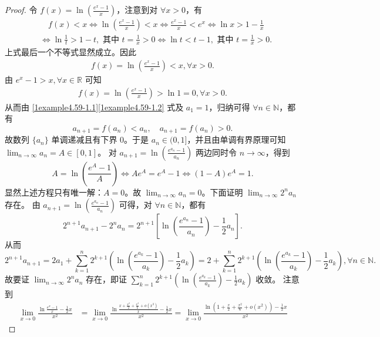 \documentclass[../../main.tex]{subfiles}
\begin{document}
\begin{proof}
令 \(f(x)=\ln\left(\frac{e^x - 1}{x}\right)\)，注意到对 \(\forall x > 0\)，有
\begin{align*}
& \quad f(x) < x \Leftrightarrow \ln\left(\frac{e^x - 1}{x}\right) < x \Leftrightarrow \frac{e^x - 1}{x} < e^x \Leftrightarrow \ln x > 1 - \frac{1}{x}\\
&\Leftrightarrow \ln\frac{1}{t} > 1 - t,\text{ 其中 }t = \frac{1}{x} > 0 \Leftrightarrow \ln t < t - 1,\text{ 其中 }t = \frac{1}{x} > 0.
\end{align*}
上式最后一个不等式显然成立。因此
\begin{align}
f(x)=\ln\left(\frac{e^x - 1}{x}\right) < x,\forall x > 0. \label{1example4.59-1.1}  
\end{align}
由 \(e^x - 1 > x,\forall x \in \mathbb{R}\) 可知
\begin{align}
f(x)=\ln\left(\frac{e^x - 1}{x}\right) > \ln 1 = 0,\forall x > 0. \label{1example4.59-1.2}
\end{align}
从而由 \eqref{1example4.59-1.1}\eqref{1example4.59-1.2} 式及 \(a_1 = 1\)，归纳可得 \(\forall n \in \mathbb{N}\)，都有
\[
a_{n + 1} = f(a_n) < a_n,\quad a_{n + 1} = f(a_n) > 0.
\]
故数列 \(\{ a_n \}\) 单调递减且有下界 \(0\)。于是 \(a_n \in (0, 1]\)，并且由单调有界原理可知 \(\lim_{n \to \infty} a_n = A \in [0, 1]\)。
对 \(a_{n + 1} = \ln\left(\frac{e^{a_n} - 1}{a_n}\right)\) 两边同时令 \(n \to \infty\)，得到
\[
A = \ln\left(\frac{e^A - 1}{A}\right) \Leftrightarrow Ae^A = e^A - 1 \Leftrightarrow (1 - A)e^A = 1.
\]
显然上述方程只有唯一解：\(A = 0\)。故 \(\lim_{n \to \infty} a_n = 0\)。下面证明 \(\lim_{n \to \infty} 2^n a_n\) 存在。
由 \(a_{n + 1} = \ln\left(\frac{e^{a_n} - 1}{a_n}\right)\) 可得，对 \(\forall n \in \mathbb{N}\)，都有
\[
2^{n + 1} a_{n + 1} - 2^n a_n = 2^{n + 1}\left[\ln\left(\frac{e^{a_n} - 1}{a_n}\right) - \frac{1}{2} a_n\right].
\]
从而
\[
2^{n + 1} a_{n + 1} = 2a_1 + \sum_{k = 1}^n 2^{k + 1}\left(\ln\left(\frac{e^{a_k} - 1}{a_k}\right) - \frac{1}{2} a_k\right) = 2 + \sum_{k = 1}^n 2^{k + 1}\left(\ln\left(\frac{e^{a_k} - 1}{a_k}\right) - \frac{1}{2} a_k\right),\forall n \in \mathbb{N}.
\]
故要证 \(\lim_{n \to \infty} 2^n a_n\) 存在，即证 \(\sum_{k = 1}^n 2^{k + 1}\left(\ln\left(\frac{e^{a_k} - 1}{a_k}\right) - \frac{1}{2} a_k\right)\) 收敛。
注意到
\begin{align*}
\lim_{x\rightarrow 0} \frac{\ln \frac{e^x-1}{x}-\frac{1}{2}x}{x^2}&=\lim_{x\rightarrow 0} \frac{\ln \frac{x+\frac{x^2}{2}+\frac{x^3}{6}+o(x^3)}{x}-\frac{1}{2}x}{x^2}=\lim_{x\rightarrow 0} \frac{\ln \left( 1+\frac{x}{2}+\frac{x^2}{6}+o(x^2) \right) -\frac{1}{2}x}{x^2}

\end{align*}
\end{proof}
\end{document}
